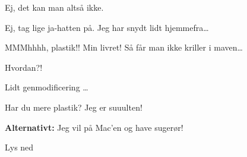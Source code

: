 \documentclass[a4paper,11pt]{article}
\begin{document}
\begin{sketch}
 Ej, det kan man altså ikke. 


 Ej, tag lige ja-hatten på. Jeg har snydt lidt hjemmefra\ldots




 MMMhhhh, plastik!! Min livret! Så får man ikke kriller i maven\ldots


 Hvordan?!


 Lidt genmodificering \ldots


 Har du mere plastik? Jeg er suuulten! 

\textbf{Alternativt:}
 Jeg vil på Mac'en og have sugerør!


\scene Lys ned


\end{sketch}
\end{document}

